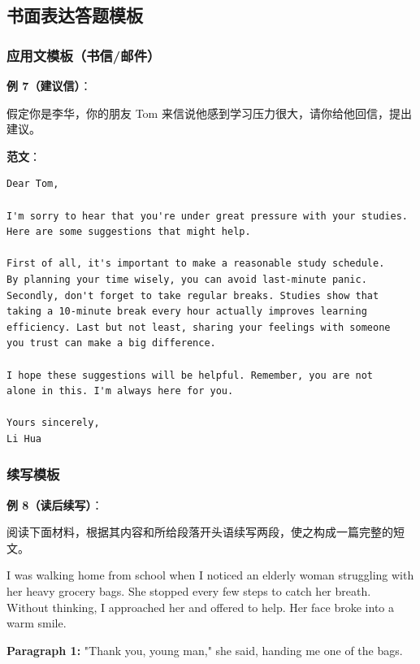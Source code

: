 \subsection{书面表达答题模板}

\subsubsection{应用文模板（书信/邮件）}

\textbf{例 7（建议信）}：

假定你是李华，你的朋友 Tom 来信说他感到学习压力很大，请你给他回信，提出建议。

\medskip

\textbf{范文}：

\begin{verbatim}
Dear Tom,

I'm sorry to hear that you're under great pressure with your studies. 
Here are some suggestions that might help.

First of all, it's important to make a reasonable study schedule. 
By planning your time wisely, you can avoid last-minute panic. 
Secondly, don't forget to take regular breaks. Studies show that 
taking a 10-minute break every hour actually improves learning 
efficiency. Last but not least, sharing your feelings with someone 
you trust can make a big difference.

I hope these suggestions will be helpful. Remember, you are not 
alone in this. I'm always here for you.

Yours sincerely,
Li Hua
\end{verbatim}

\subsubsection{续写模板}

\textbf{例 8（读后续写）}：

阅读下面材料，根据其内容和所给段落开头语续写两段，使之构成一篇完整的短文。

\medskip

I was walking home from school when I noticed an elderly woman struggling with her heavy grocery bags. She stopped every few steps to catch her breath. Without thinking, I approached her and offered to help. Her face broke into a warm smile.

\medskip

\textbf{Paragraph 1:} "Thank you, young man," she said, handing me one of the bags. \underline{\hspace{8cm}}

